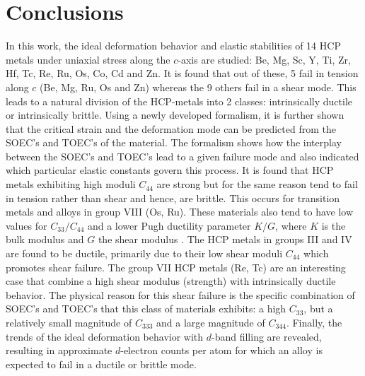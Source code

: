 \documentclass[showpacs,aps,floatfix,prb,reprint,superscriptaddress]{revtex4-1}
\begin{document}
\section{Conclusions}
In this work, the ideal deformation behavior and elastic stabilities of 14 HCP metals under uniaxial stress along the $c$-axis are studied: Be, Mg, Sc, Y, Ti, Zr, Hf, Tc, Re, Ru, Os, Co, Cd and Zn. It is found that out of these, 5 fail in tension along $c$ (Be, Mg, Ru, Os and Zn) whereas the 9 others fail in a shear mode. This leads to a natural division of the HCP-metals into 2 classes: intrinsically ductile or intrinsically brittle. Using a newly developed formalism, it is further shown that the critical strain and the deformation mode can be predicted from the SOEC's and TOEC's of the material. The formalism shows how the interplay between the SOEC's and TOEC's lead to a given failure mode and also indicated which particular elastic constants govern this process. It is found that HCP metals exhibiting high moduli $C_{44}$ are strong but for the same reason tend to fail in tension rather than shear and hence, are brittle. This occurs for transition metals and alloys in group VIII (Os, Ru). These materials also tend to have low values for $C_{33}/C_{44}$ and a lower Pugh ductility parameter $K/G$, where $K$ is the bulk modulus and $G$ the shear modulus \cite{pugh1954xcii}. The HCP metals in groups III and IV are found to be ductile, primarily due to their low shear moduli $C_{44}$ which promotes shear failure. The group VII HCP metals (Re, Tc) are an interesting case that combine a high shear modulus (strength) with intrinsically ductile behavior. The physical reason for this shear failure is the specific combination of SOEC's and TOEC's that this class of materials exhibits: a high $C_{33}$, but a relatively small magnitude of $C_{333}$ and a large magnitude of $C_{344}$. Finally, the trends of the ideal deformation behavior with $d$-band filling are revealed, resulting in approximate $d$-electron counts per atom for which an alloy is expected to fail in a ductile or brittle mode.



\end{document}

